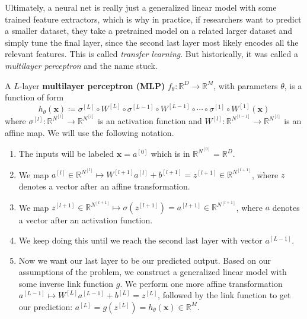   Ultimately, a neural net is really just a generalized linear model with some trained feature extractors, which is why in practice, if researchers want to predict a smaller dataset, they take a pretrained model on a related larger dataset and simply tune the final layer, since the second last layer most likely encodes all the relevant features. This is called \textit{transfer learning}. But historically, it was called a \textit{multilayer perceptron} and the name stuck. 

  \begin{definition}
    A $L$-layer \textbf{multilayer perceptron (MLP)} $f_\theta : \mathbb{R}^D \rightarrow \mathbb{R}^M$, with parameters $\theta$, is a function of form 
    \begin{equation}
      h_\theta (\mathbf{x}) \coloneqq \sigma^{[L]} \circ W^{[L]} \circ \sigma^{[L-1]} \circ W^{[L-1]} \circ \cdots \circ \sigma^{[1]} \circ W^{[1]} (\mathbf{x})
    \end{equation}
    where $\sigma^{[l]}: \mathbb{R}^{N^{[l]}} \rightarrow \mathbb{R}^{N^{[l]}}$ is an activation function and $W^{[l]}: \mathbb{R}^{N^{[l-1]}} \rightarrow \mathbb{R}^{N^{[l]}}$ is an affine map. We will use the following notation. 
    \begin{enumerate}
      \item The inputs will be labeled $\mathbf{x} = a^{[0]}$ which is in $\mathbb{R}^{N^{[0]}} = \mathbb{R}^D$. 
      
      \item We map $a^{[l]} \in \mathbb{R}^{N^{[l]}} \mapsto W^{[l+1]} a^{[l]} + b^{[l+1]}= z^{[l+1]} \in \mathbb{R}^{N^{[l+1]}}$, where $z$ denotes a vector after an affine transformation. 
      \item We map $z^{[l+1]} \in \mathbb{R}^{N^{[l+1]}} \mapsto \sigma(z^{[l+1]}) = a^{[l+1]} \in \mathbb{R}^{N^{[l+1]}}$, where $a$ denotes a vector after an activation function. 
      \item We keep doing this until we reach the second last layer with vector $a^{[L-1]}$. 
      \item Now we want our last layer to be our predicted output. Based on our assumptions of the problem, we construct a generalized linear model with some inverse link function $g$. We perform one more affine transformation $a^{[L-1]} \mapsto W^{[L]} a^{[L-1]} + b^{[L]} = z^{[L]}$, followed by the link function to get our prediction: $a^{[L]} = g(z^{[L]}) = h_{\theta} (\mathbf{x}) \in \mathbb{R}^M$. 
    \end{enumerate}


\end{definition}
